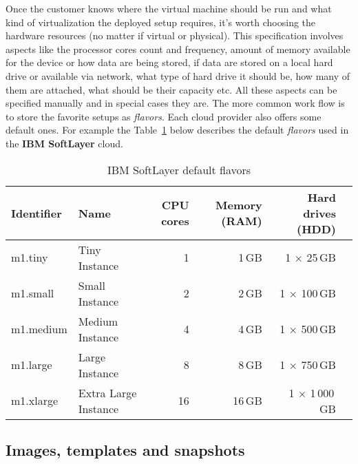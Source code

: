 Once the customer knows where the virtual machine should be run and what kind of virtualization the deployed setup requires, it's worth choosing the hardware resources (no matter if virtual or physical). This specification involves aspects like the processor cores count and frequency, amount of memory available for the device or how data are being stored, if data are stored on a local hard drive or available via network, what type of hard drive it should be, how many of them are attached, what should be their capacity etc. All these aspects can be specified manually and in special cases they are. The more common work flow is to store the favorite setups as \emph{flavors}. Each cloud provider also offers some default ones. For example the Table~\ref{tab:IBM SoftLayer default flavors} below describes the default \emph{flavors} used in the \textbf{IBM SoftLayer} cloud.

\begin{table}[ht]
	\centering
	\caption{IBM SoftLayer default flavors}\label{tab:IBM SoftLayer default flavors}
	\begin{tabular}{llrrrr}
		\toprule
		Identifier & Name                 & CPU cores & Memory (RAM) & Hard drives (HDD)     \\
		\midrule
		m1.tiny    & Tiny Instance        & 1         & 1\,GB        & 1 $\times$ 25\,GB     \\
		m1.small   & Small Instance       & 2         & 2\,GB        & 1 $\times$ 100\,GB    \\
		m1.medium  & Medium Instance      & 4         & 4\,GB        & 1 $\times$ 500\,GB    \\
		m1.large   & Large Instance       & 8         & 8\,GB        & 1 $\times$ 750\,GB    \\
		m1.xlarge  & Extra Large Instance & 16        & 16\,GB       & 1 $\times$ 1\,000\,GB \\
		\bottomrule
	\end{tabular}
\end{table}

\subsection{Images, templates and snapshots}
\label{sub:Images, templates and snapshots}

